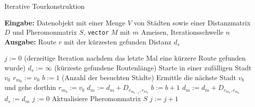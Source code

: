 \documentclass[doktyp=barbeit, sprache=german]{TUBAFarbeiten}
\begin{document}
\begin{algorithm}
\caption{Iterative Tourkonstruktion}
\label{IterativeTour}
\textbf{Eingabe:} Datenobjekt mit einer Menge $V$ von Städten sowie einer Distanzmatrix $D$ und Pheromonmatrix $S$, \texttt{vector} $M$ mit $m$ Ameisen, Iterationsschwelle $n$
\\\textbf{Ausgabe:} Route $r$ mit der kürzesten gefunden Distanz $d_s$
\begin{algorithmic}[1]
\State $j := 0$ (derzeitige Iteration nachdem das letzte Mal eine kürzere Route gefunden wurde)
\State $d_s := \infty$ (kürzeste gefundene Routenlänge)
\State Starte in einer zufälligen Stadt $v_0$
\State $r_{m_0} := v_0$
\State $b := 1$ (Anzahl der besuchten Städte)
\State Ermittle die nächste Stadt $v_b$ und gehe dorthin
\State $r_{m_b} := v_b$
\State $d_m := d_m + D_{r_{m_{b-1}},r_{m_b}}$
\State $b := b + 1$
\EndWhile
\State $d_m := d_m + D_{r_{m_b},r_{m_0}}$
\State $d_s := d_m$
\State $j := 0$
\EndIf
\State Aktualisiere Pheromonmatrix $S$
\State $j := j + 1$
\EndIf
\EndFor
\end{algorithmic}
\end{algorithm}
\end{document}
